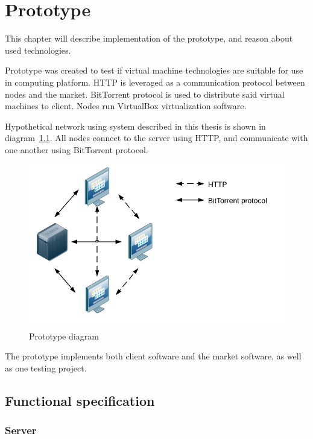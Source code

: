 \chapter{Prototype}
\label{ch:prototype}

This chapter will describe implementation of the prototype, and reason about used technologies.

Prototype was created to test if virtual machine technologies are suitable for use in computing platform. HTTP is leveraged as a communication protocol between nodes and the market. BitTorrent protocol is used to distribute said virtual machines to client. Nodes run VirtualBox virtualization software.

Hypothetical network using system described in this thesis is shown in diagram~\ref{f:protomain}. All nodes connect to the server using HTTP, and communicate with one another using BitTorrent protocol.

\begin{figure}
\centering
\includegraphics{diagrams/PrototypeMain.pdf}
\caption{Prototype diagram}
\label{f:protomain}
\end{figure}

The prototype implements both client software and the market software, as well as one testing project.

\section{Functional specification}

\subsection{Server}

